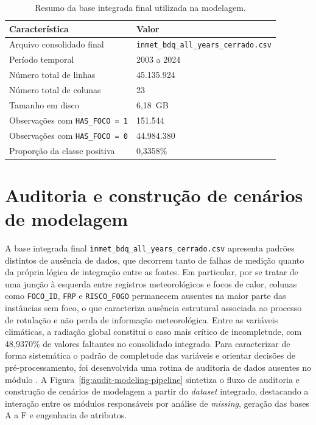 \begin{table}[H]
\centering
\caption{Resumo da base integrada final utilizada na modelagem.}
\label{tab:dataset-integrado-resumo}
\begin{tabular}{p{7.2cm}p{5.2cm}}
\hline
\textbf{Característica} & \textbf{Valor} \\
\hline
Arquivo consolidado final & \texttt{inmet\_bdq\_all\_years\_cerrado.csv} \\
Período temporal & 2003 a 2024 \\
Número total de linhas & 45.135.924 \\
Número total de colunas & 23 \\
Tamanho em disco & 6,18~GB \\
Observações com \texttt{HAS\_FOCO = 1} & 151.544 \\
Observações com \texttt{HAS\_FOCO = 0} & 44.984.380 \\
Proporção da classe positiva & 0,3358\% \\
\hline
\end{tabular}
\end{table}

\section{Auditoria e construção de cenários de modelagem}
\label{sec:bases-modelagem}

A base integrada final \texttt{inmet\_bdq\_all\_years\_cerrado.csv} apresenta padrões distintos de ausência de dados, que decorrem tanto de falhas de medição quanto da própria lógica de integração entre as fontes. Em particular, por se tratar de uma junção à esquerda entre registros meteorológicos e focos de calor, colunas como \texttt{FOCO\_ID}, \texttt{FRP} e \texttt{RISCO\_FOGO} permanecem ausentes na maior parte das instâncias sem foco, o que caracteriza ausência estrutural associada ao processo de rotulação e não perda de informação meteorológica. Entre as variáveis climáticas, a radiação global constitui o caso mais crítico de incompletude, com 48,9370\% de valores faltantes no consolidado integrado. Para caracterizar de forma sistemática o padrão de completude das variáveis e orientar decisões de pré-processamento, foi desenvolvida uma rotina de auditoria de dados ausentes no módulo . A Figura~\ref{fig:audit-modeling-pipeline} sintetiza o fluxo de auditoria e construção de cenários de modelagem a partir do \textit{dataset} integrado, destacando a interação entre os módulos responsáveis por análise de \textit{missing}, geração das bases A a F e engenharia de atributos.

